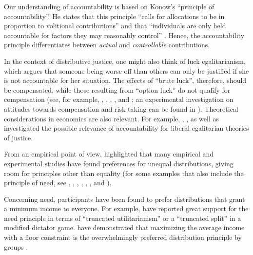 \documentclass[smallcondensed]{svjour3}
\begin{document}
%
Our understanding of accountability is based on Konow's ``principle of accountability''. He states that this principle ``calls for allocations to be in proportion to volitional contributions'' \citep[p. 138]{konow_fair_2001} and that ``individuals are only held accountable for factors they may reasonably control'' \citep[p.~142]{konow_fair_2001}. Hence, the accountability principle differentiates between \textit{actual} and \textit{controllable} contributions.\par
%
In the context of distributive justice, one might also think of luck egalitarianism, which argues that someone being worse-off than others can only be justified if she is not accountable for her situation. The effects of ``brute luck'', therefore, should be compensated, while those resulting from ``option luck'' do not qualify for compensation (see, for example, \citealt{dworkin_equality_1981}, \citealt{temkin_inequality_1993}, \citealt{knight_luck_2009}, \citealt{cohen_currency_2011}, and \citealt{tan_justice_2012}; an experimental investigation on attitudes towards compensation and risk-taking can be found in \citealt{cappelen_just_2013}). Theoretical considerations in economics are also relevant. For example, \citet{cappelen_responsibility_2005, cappelen_responsibility_2006}, \citet{cappelen_relocating_2006}, as well as \citet{cappelen_disability_2010} investigated the possible relevance of accountability for liberal egalitarian theories of justice.\par
%
From an empirical point of view, \cite{konow_is_2009} highlighted that many empirical and experimental studies have found preferences for unequal distributions, giving room for principles other than equality (for some examples that also include the principle of need, see \citealt{deutsch_equity_1975}, \citealt{leventhal_distribution_1976}, \citealt{lerner_justice_1977}, \citealt{lamm_norms_1980}, \citealt{deutsch_distributive_1985}, \citealt{scott_just_2001}, and \citealt{cappelen_rich_2008}).\par
%
Concerning need, participants have been found to prefer distributions that grant a minimum income to everyone. For example, \citet{ahlert_thresholds_2012} have reported great support for the need principle in terms of ``truncated utilitarianism'' or a ``truncated split'' in a modified dictator game. \citet{frohlich_choosing_1992} have demonstrated that maximizing the average income with a floor constraint is the overwhelmingly preferred distribution principle by groups \citep[also see][]{frohlich_choices_1987}.\par
\end{document}
